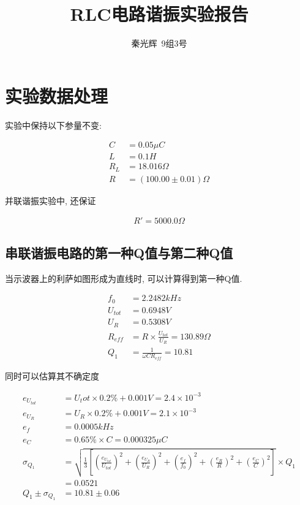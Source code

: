 \documentclass[a4paper,12pt,notitlepage]{article}
\begin{document}
\title{RLC电路谐振实验报告}
\author{秦光辉\ 9组3号}
\maketitle

\section{实验数据处理}

	实验中保持以下参量不变:
	
\begin{align*}
	C &= 0.05 \mu C \\
	L &= 0.1 H \\
	R_L &= 18.016\Omega \\
	R &= (100.00 \pm 0.01) \Omega	
\end{align*}

	并联谐振实验中, 还保证
	
\begin{align*}
	R' = 5000.0 \Omega
\end{align*}

\subsection{串联谐振电路的第一种Q值与第二种Q值}

	当示波器上的利萨如图形成为直线时, 可以计算得到第一种Q值.
	
\begin{align*}
	f_0 &= 2.2482 kHz \\
	U_{tot} &= 0.6948 V \\
	U_R &= 0.5308 V \\
	R_{eff} &= R \times \frac{U_{tot}}{U_R} = 130.89 \Omega \\
	Q_1 &= \frac{1}{\omega CR_{eff}} = 10.81
\end{align*}

	同时可以估算其不确定度
	
\begin{align*}
	e_{U_{tot}} &= U_tot \times 0.2\% + 0.001V = 2.4 \times 10^{-3} \\
	e_{U_{R}} &= U_R \times 0.2\% + 0.001V = 2.1 \times 10^{-3} \\
	e_f &= 0.0005kHz \\
	e_C &= 0.65\% \times C = 0.000325 \mu C \\
	\sigma_{Q_1} &= \sqrt{\frac{1}{3}[(\frac{e_{U_{tot}}}{U_{tot}})^2 + (\frac{e_{U_R}}{U_R})^2 + (\frac{e_f}{f_0})^2 + (\frac{e_R}{R})^2 + (\frac{e_C}{C})^2]}\times Q_1 \\
	&= 0.0521 \\
	Q_1 \pm \sigma_{Q_1} &= 10.81 \pm 0.06
\end{align*}
\end{document}
